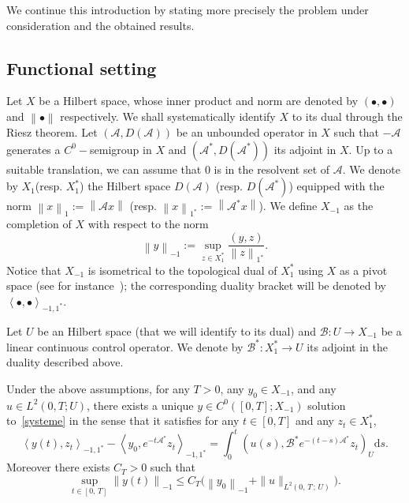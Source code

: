 \documentclass[AHL,Unicode,longabstracts]{cedram}
\newcommand\A{\mathcal{A}}
\newcommand\As{\mathcal{A}^*}
\newcommand\B{\mathcal{B}}
\newcommand\Bs{\mathcal{B}^*}
\newcommand{\DA}{D(\A)}
\newcommand{\Xun}{X_1}
\newcommand{\Xuns}{X_1^*}
\newcommand{\Xmun}{X_{-1}}
\newcommand{\normeX}[1]{\left\| #1 \right\|}
\newcommand{\normeXun}[1]{\left\| #1 \right\|_{1}}
\newcommand{\normeXuns}[1]{\left\| #1 \right\|_{1^*}}
\newcommand{\normeXmun}[1]{\left\| #1 \right\|_{-1}}
\newcommand{\psX}[2]{\left(#1, #2 \right)}
\newcommand{\psU}[2]{\left(#1, #2 \right)_U}
\newcommand{\dualX}[2]{\left\langle #1, #2 \right\rangle_{-1,1^*}}
\newcommand{\md}{\mathrm{d}}
\renewcommand{\cdot}{{\scriptstyle \bullet}}
\begin{document}
We continue this introduction by stating more precisely the problem under consideration and the obtained results.



\subsection{Functional setting}

Let $X$ be a Hilbert space, whose inner product and norm are denoted by $\psX{\cdot}{\cdot}$ and $\normeX{\cdot}$ respectively. We shall systematically identify $X$ to its dual through the Riesz theorem. Let $(\A, \DA)$ be an unbounded operator in $X$ such that $-\A$ generates a $C^0-$semigroup in $X$ and $(\As,D(\As))$ its adjoint in $X$. Up to a suitable translation, we can assume that $0$ is in the resolvent set of $\A$. We denote by $\Xun$\linebreak(resp. $\Xuns$) the Hilbert space $D(\A)$ (resp. $D(\As)$) equipped with the norm $\normeXun{x} := \normeX{\A x}$ (resp. $\normeXuns{x} := \normeX{\As x}$). We define $\Xmun$ as the completion of $X$ with respect to the norm
\begin{equation*}\label{Def:NormeX-1}
\normeXmun{y} := \sup_{z \in X_1^*} \frac{\psX{y}{z}}{\normeXuns{z}}.
\end{equation*}
Notice that $\Xmun$ is isometrical to the topological dual of $\Xuns$ using $X$ as a pivot space (see for instance~\cite[Proposition~2.10.2]{TucsnakWeissBook}); the corresponding duality bracket will be denoted by $\dualX{\cdot}{\cdot}$.

Let $U$ be an Hilbert space (that we will identify to its dual) and $\B:U\to \Xmun$ be a linear continuous control operator. We denote by $\Bs:\Xuns\to U$ its adjoint in the duality described above.

\begin{prop}\label{Prop:WellposednessGeneral}
Under the above assumptions, for any $T>0$, any $y_0 \in \Xmun$, and any $u \in L^2(0,T ; U)$, there exists a unique $y \in C^0([0,T]; \Xmun)$ solution to~\eqref{systeme} in the sense that it satisfies for any $t \in [0,T]$ and any $z_t \in \Xuns$,
\begin{equation}\label{CaracterisationDualeSolutionsGeneral}
\dualX{y(t)}{z_t} - \dualX{y_0}{e^{-t\As} z_t} = \int_0^t \psU{u(s)}{ \Bs e^{-(t-s) \As} z_t} \md s.
\end{equation}
Moreover there exists $C_T>0$ such that
\[
\sup\limits_{t \in [0,\,T]} \normeXmun{y(t)} \leq C_T \big(\normeXmun{y_0} + \| u \|_{L^2(0,\,T\,;\,U)} \big).
\]
\end{prop}
\end{document}
